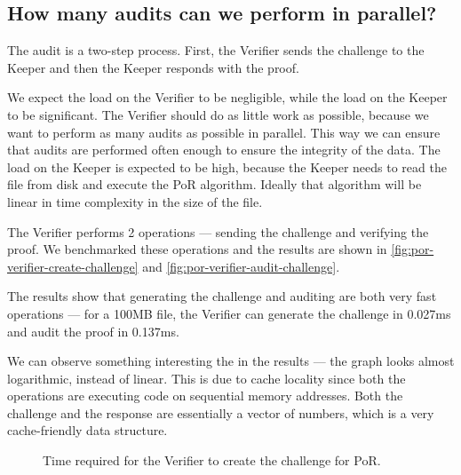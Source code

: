 \subsection{How many audits can we perform in parallel?}

The audit is a two-step process.
First, the Verifier sends the challenge to the Keeper and then the Keeper responds with the proof.

We expect the load on the Verifier to be negligible, while the load on the Keeper to be significant.
The Verifier should do as little work as possible,
because we want to perform as many audits as possible in parallel.
This way we can ensure that audits are performed often enough to ensure the integrity of the data.
The load on the Keeper is expected to be high,
because the Keeper needs to read the file from disk and execute the PoR algorithm.
Ideally that algorithm will be linear in time complexity in the size of the file.

The Verifier performs 2 operations --- sending the challenge and verifying the proof.
We benchmarked these operations and the results are shown in \autoref{fig:por-verifier-create-challenge}
and \autoref{fig:por-verifier-audit-challenge}.

The results show that generating the challenge and auditing are both very fast operations ---
for a 100MB file, the Verifier can generate the challenge in 0.027ms and
audit the proof in 0.137ms.

We can observe something interesting the in the results ---
the graph looks almost logarithmic, instead of linear.
This is due to cache locality since both the operations are executing code on sequential memory addresses.
Both the challenge and the response are essentially a vector of numbers,
which is a very cache-friendly data structure.

\begin{figure}
  \myfloatalign
  \caption[]{Time required for the Verifier to create the challenge for PoR.}
  \label{fig:por-verifier-create-challenge}
\end{figure}

